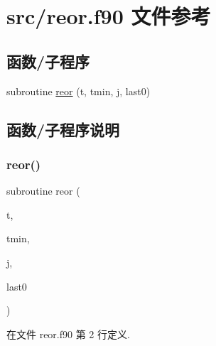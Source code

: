 \hypertarget{reor_8f90}{}\section{src/reor.f90 文件参考}
\label{reor_8f90}
\subsection*{函数/子程序}
\begin{DoxyCompactItemize}
\item 
subroutine \mbox{\hyperlink{reor_8f90_ab933c94c3120c674e0a9b426eaa44bf1}{reor}} (t, tmin, j, last0)
\end{DoxyCompactItemize}


\subsection{函数/子程序说明}
\mbox{\label{reor_8f90_ab933c94c3120c674e0a9b426eaa44bf1}} 
\subsubsection{\texorpdfstring{reor()}{reor()}}
{\footnotesize\ttfamily subroutine reor (\begin{DoxyParamCaption}\item[{}]{t,  }\item[{}]{tmin,  }\item[{}]{j,  }\item[{}]{last0 }\end{DoxyParamCaption})}



在文件 reor.\+f90 第 2 行定义.

